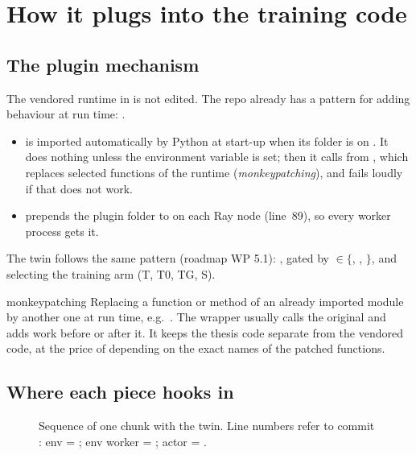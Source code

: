 \section{How it plugs into the training code}\label{twin:sec:integration}
\subsection{The plugin mechanism}
The vendored runtime in  is not edited. The repo already has a pattern for adding behaviour at run time: .
\begin{itemize}
\item {} is imported automatically by Python at start-up when its folder is on . It does nothing unless the environment variable  is set; then it calls  from , which replaces selected functions of the runtime (\emph{monkeypatching}), and fails loudly if that does not work.
\item {} prepends the plugin folder to  on each Ray node (line~89), so every worker process gets it.
\end{itemize}
The twin follows the same pattern \planned{} (roadmap WP 5.1): , gated by  $\in\{$, , $\}$, and  selecting the training arm (T, T0, TG, S).

\begin{newc}{monkeypatching}
Replacing a function or method of an already imported module by another one at run time, e.g.\ . The wrapper usually calls the original and adds work before or after it. It keeps the thesis code separate from the vendored code, at the price of depending on the exact names of the patched functions.
\end{newc}

\subsection{Where each piece hooks in}
\begin{figure}[p]
\centering

\caption{Sequence of one chunk with the twin. Line numbers refer to commit : env = ; env worker = ; actor = .}
\label{twin:fig:seq}
\end{figure}

